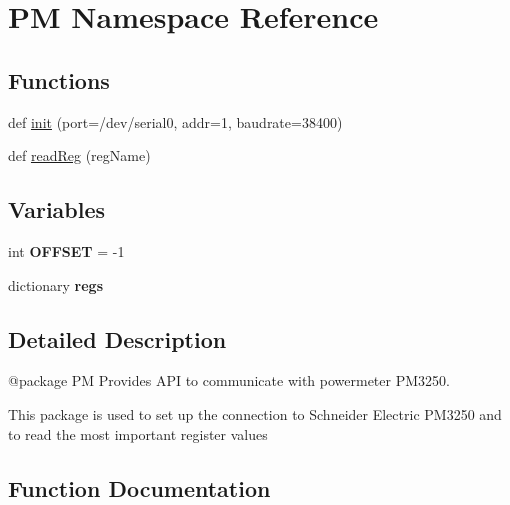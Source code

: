 \hypertarget{namespacePM}{}\section{PM Namespace Reference}
\label{namespacePM}
\subsection*{Functions}
\begin{DoxyCompactItemize}
\item 
def \hyperlink{namespacePM_a0f8321915d0cf1c22153f484bd184f36}{init} (port=\textquotesingle{}/dev/serial0\textquotesingle{}, addr=1, baudrate=38400)
\item 
def \hyperlink{namespacePM_a825d69d2e8f75daae4ef6359f77b7197}{read\+Reg} (reg\+Name)
\end{DoxyCompactItemize}
\subsection*{Variables}
\begin{DoxyCompactItemize}
\item 
\mbox{\label{namespacePM_aa4797618f22072d546804bfa5ef809c2}} 
int {\bfseries O\+F\+F\+S\+ET} = -\/1
\item 
\mbox{\label{namespacePM_a2f79a32d24ad04a37fce8c70301dc8fd}} 
dictionary {\bfseries regs}
\end{DoxyCompactItemize}


\subsection{Detailed Description}
\begin{DoxyVerb}@package PM
Provides API to communicate with powermeter PM3250.

This package is used to set up the connection to Schneider Electric
PM3250 and to read the most important register values
\end{DoxyVerb}
 

\subsection{Function Documentation}
\mbox{\label{namespacePM_a0f8321915d0cf1c22153f484bd184f36}} 
